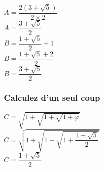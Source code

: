 $ A = \dfrac{2\left(3+\sqrt{5}\right)}{2\times 2} $ \\

$ A = \dfrac{3+\sqrt{5}}{2} $ \\

$ B = \dfrac{1 + \sqrt{5}}{2} + 1 $ \\

$ B = \dfrac{1 + \sqrt{5} + 2}{2} $ \\

$ B = \dfrac{3 + \sqrt{5}}{2} $ \\

\subsubsection{Calculez d'un seul coup}

$ C = \sqrt{1+\sqrt{1+\sqrt{1+\varphi}}} $ \\

$ C = \sqrt{1+\sqrt{1+\sqrt{1+\dfrac{1 + \sqrt{5}}{2}}}} $ \\

$ C = \dfrac{1 + \sqrt{5}}{2} $ \\




\ifdefined\COMPLETE
\else
    
\fi
